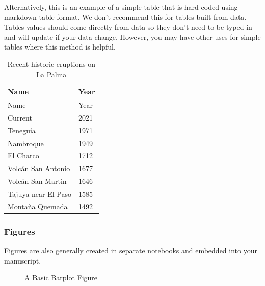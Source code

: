 \documentclass[
]{agujournal2019}
\begin{document}
Alternatively, this is an example of a simple table that is hard-coded
using markdown table format. We don't recommend this for tables built
from data. Tables values should come directly from data so they don't
need to be typed in and will update if your data change. However, you
may have other uses for simple tables where this method is helpful.

\begin{longtable}[]{@{}ll@{}}
\caption{Recent historic eruptions on La
Palma}\label{tbl-history}\tabularnewline
\toprule\noalign{}
Name & Year \\
\midrule\noalign{}
\endfirsthead
\toprule\noalign{}
Name & Year \\
\midrule\noalign{}
\endhead
\bottomrule\noalign{}
\endlastfoot
Current & 2021 \\
Teneguía & 1971 \\
Nambroque & 1949 \\
El Charco & 1712 \\
Volcán San Antonio & 1677 \\
Volcán San Martin & 1646 \\
Tajuya near El Paso & 1585 \\
Montaña Quemada & 1492 \\
\end{longtable}

\subsubsection{Figures}\label{figures}

Figures are also generally created in separate notebooks and embedded
into your manuscript.

\begin{figure}[H]


\caption{\label{fig-1}A Basic Barplot Figure}

\end{figure}%
\end{document}
